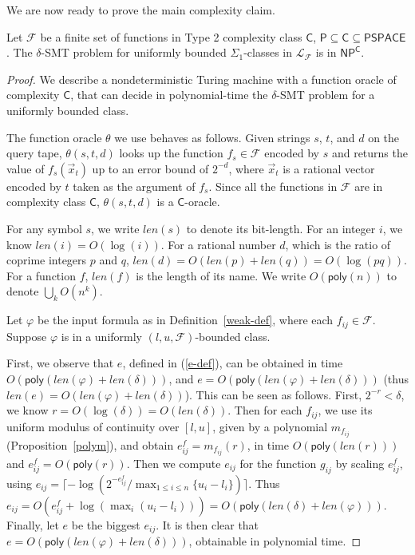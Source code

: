 \documentclass[prodmode]{acmsmall} %
\newcommand{\len}{\mathit{len}}
\newcommand{\poly}{\mathsf{poly}}
\begin{document}
We are now ready to prove the main complexity claim.

\begin{theorem}[Complexity]
Let $\mathcal{F}$ be a finite set of functions in Type 2 complexity class $\mathsf{C}$, $\mathsf{P}\subseteq\mathsf{C}\subseteq\mathsf{PSPACE}$. The $\delta$-SMT problem for uniformly bounded $\Sigma_1$-classes in $\mathcal{L}_{\mathcal{F}}$ is in $\mathsf{NP^C}$. 
\end{theorem}
\begin{proof}
We describe a nondeterministic Turing machine with a function oracle of complexity $\mathsf{C}$, that can decide in polynomial-time the $\delta$-SMT problem for a uniformly bounded class.

The function oracle $\theta$ we use behaves as follows. Given strings $s$, $t$, and $d$ on the query tape, $\theta(s,t,d)$ looks up the function $f_s\in \mathcal{F}$ encoded by $s$ and returns the value of $f_s({\vec x}_t)$ up to an error bound of $2^{-d}$, where ${\vec x}_t$ is a rational vector encoded by $t$ taken as the argument of $f_s$. Since all the functions in $\mathcal{F}$ are in complexity class $\mathsf{C}$, $\theta(s,t,d)$ is a $\mathsf{C}$-oracle. 

For any symbol $s$, we write $\len(s)$ to denote its bit-length. For an integer $i$, we know $\len(i)= O(\log(i))$. For a rational number $d$, which is the ratio of coprime integers $p$ and $q$, $\len(d)= O(\len(p)+\len(q))= O(\log(pq))$. For a function $f$, $len(f)$ is the length of its name. We write $O(\poly(n))$ to denote $\bigcup_kO(n^k)$. 

Let $\varphi$ be the input formula as in Definition~\ref{weak-def}, where each $f_{ij}\in \mathcal{F}$. Suppose $\varphi$ is in a uniformly $(l,u,\mathcal{F})$-bounded class. 

First, we observe that $e$, defined in (\ref{e-def}), can be obtained in time $O(\poly(\len(\varphi)+\len(\delta)))$, and $e = O(\poly(\len(\varphi)+\len(\delta)))$ (thus $\len(e) = O(\len(\varphi)+\len(\delta))$). This can be seen as follows. First, $2^{-r}<\delta$, we know $r= O(\log(\delta)) = O(\len(\delta))$. Then for each $f_{ij}$, we use its uniform modulus of continuity over $[l,u]$, given by a polynomial $m_{f_{ij}}$ (Proposition~\ref{polym}), and obtain $e_{ij}^f = m_{f_{ij}}(r)$, in time $O(\poly(\len(r)))$ and $e_{ij}^f = O(\poly(r))$. Then we compute $e_{ij}$ for the function $g_{ij}$ by scaling $e_{ij}^f$, using $e_{ij}  = \lceil -\log(2^{-e^f_{ij}}/\max_{1\leq i\leq n}\{u_i-l_i\})\rceil$. Thus $e_{ij} = O(e_{ij}^f+\log(\max_i(u_i-l_i))) = O(\poly(\len(\delta)+\len(\varphi)))$. Finally, let $e$ be the biggest $e_{ij}$. It is then clear that $e = O(\poly(\len(\varphi)+\len(\delta)))$, obtainable in polynomial time. 


\end{proof}
\end{document}
